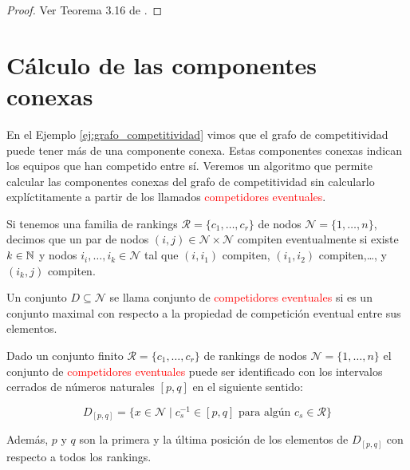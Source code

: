 \begin{proof}
Ver Teorema 3.16 de \cite{journals/corr/CriadoGPR13a}.
\end{proof}


\section{Cálculo de las componentes conexas}

En el Ejemplo \ref{ej:grafo_competitividad} vimos que el grafo de competitividad puede tener más de una componente conexa. Estas componentes conexas indican los equipos que han competido entre sí. Veremos un algoritmo que permite calcular las componentes conexas del grafo de competitividad sin calcularlo explíctitamente a partir de los llamados \textcolor{red}{competidores eventuales}.

\begin{defi}
Si tenemos una familia de rankings $\mathcal{R} = \{c_1,\dots,c_r\}$ de nodos $\mathcal{N} = \{1,\dots,n\}$, decimos que un par de nodos $(i,j) \in \mathcal{N} \times \mathcal{N}$ compiten eventualmente si existe $k \in \mathbb{N}$ y nodos $i_i,\dots,i_k \in \mathcal{N}$ tal que $(i,i_1)$ compiten, $(i_1,i_2)$ compiten,\dots, y $(i_k,j)$ compiten. 
\end{defi}

\begin{defi}
Un conjunto $D \subseteq \mathcal{N}$ se llama conjunto de \textcolor{red}{competidores eventuales} si es un conjunto maximal con respecto a la propiedad de competición eventual entre sus elementos.
\end{defi}

\begin{teo}
Dado un conjunto finito $\mathcal{R} = \{ c_1, \dots, c_r \}$ de rankings de nodos $\mathcal{N} = \{1,\dots, n\}$ el conjunto de \textcolor{red}{competidores eventuales} puede ser identificado con los intervalos cerrados de números naturales $[p,q]$ en el siguiente sentido:

\begin{equation*}
D_{[p,q]} = \{ x \in \mathcal{N} \mid c_s^{-1} \in [p,q] \text{ para algún } c_s \in \mathcal{R} \}
\end{equation*}

Además, $p$ y $q$ son la primera y la última posición de los elementos de $D_{[p,q]}$ con respecto a todos los rankings.
\end{teo} 

